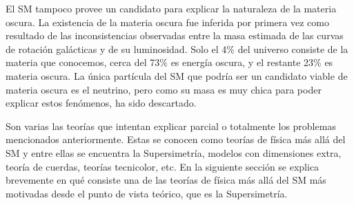 El SM tampoco provee un candidato para explicar la naturaleza de la materia
oscura. La existencia de la materia oscura fue inferida por primera vez como
resultado de las inconsistencias observadas entre la masa estimada de las curvas
de rotación galácticas y de su luminosidad\cite{DM1}. Solo el 4\% del universo
consiste de la materia que conocemos\cite{DM2}, cerca del 73\% es
energía oscura, y el restante 23\% es materia oscura. La única partícula del SM
que podría ser un candidato viable de materia oscura es el neutrino, pero como
su masa es muy chica para poder explicar estos fenómenos, ha sido descartado.

Son varias las teorías que intentan explicar parcial o totalmente los problemas
mencionados anteriormente. Estas se conocen como teorías de física más allá del SM y entre
ellas se encuentra la Supersimetría, modelos con dimensiones extra, teoría de
cuerdas, teorías tecnicolor, etc. En la siguiente sección se explica brevemente
en qué consiste una de las teorías de física más allá del SM más motivadas desde
el punto de vista teórico, que es la Supersimetría.
